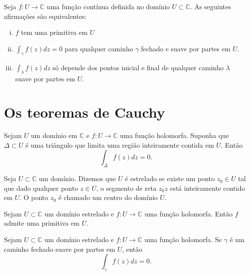 \begin{teorema}
Seja $f:U\to \mathbb{C}$ uma função contínua definida no domínio $U\subset\mathbb{C}$. As seguintes afirmações são equivalentes:
\begin{enumerate}[(i)]
    \item $f$ tem uma primitiva em $U$
    \item $\int_{\gamma} f(z) dz = 0$ para qualquer caminho $\gamma$ fechado e suave por partes em $U$.
    \item $\int_{\lambda} f(z) dz$ só depende dos pontos inicial e final de qualquer caminho $\lambda$ suave por partes em $U$.
\end{enumerate}
\end{teorema}


\section[Os teoremas de Cauchy]{Os teoremas de Cauchy}

\begin{teorema}
\label{teo:cauchy-goursat}
Sejam $U$ um domínio em $\mathbb{C}$ e $f: U \to \mathbb{C}$ uma função holomorfa. Suponha que $\Delta \subset U$ é uma triângulo que limita
uma região inteiramente contida em $U$. Então
\begin{equation*}
    \int_{\Delta} f(z) dz = 0.
\end{equation*}
\end{teorema}


\begin{definicao}
Seja $U\subset\mathbb{C}$ um domínio. Dizemos que $U$ é estrelado se existe um ponto $z_0\in U$
tal que dado qualquer ponto $z\in U$, o segmento de reta $\overline{z_0z}$ está inteiramente contido em $U$. 
O ponto $z_0$ é chamado um centro do domínio $U$.
\end{definicao}


\begin{corolario}
Sejam $U\subset\mathbb{C}$ um domínio estrelado e $f:U\to\mathbb{C}$ uma
função holomorfa. Então $f$ admite uma primitiva em $U$.
\end{corolario}


\begin{corolario}
Sejam $U\subset\mathbb{C}$ um domínio estrelado e $f:U\to\mathbb{C}$ uma função holomorfa.
Se $\gamma$ é um caminho fechado suave por partes em $U$, então
\begin{equation*}
    \int_{\gamma} f(z) dz = 0.
\end{equation*}
\end{corolario}


